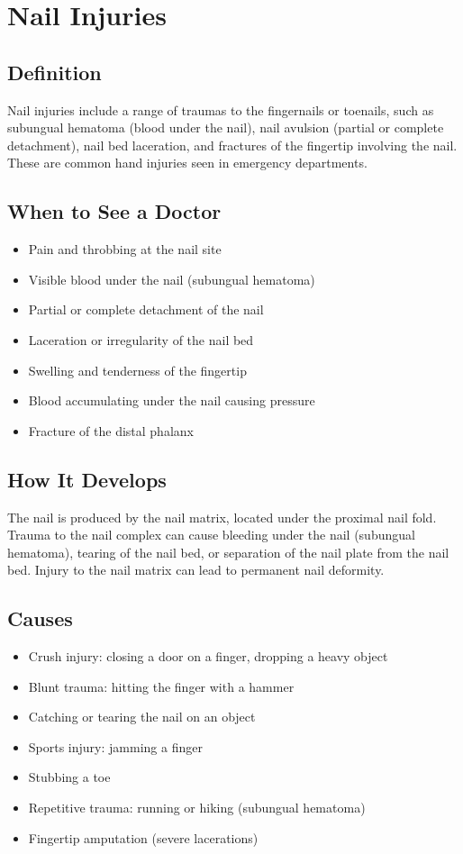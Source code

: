 \chapter{Nail Injuries}

\section*{Definition}
Nail injuries include a range of traumas to the fingernails or toenails, such as subungual hematoma (blood under the nail), nail avulsion (partial or complete detachment), nail bed laceration, and fractures of the fingertip involving the nail. These are common hand injuries seen in emergency departments.

\section*{When to See a Doctor}
\begin{itemize}
\item Pain and throbbing at the nail site
\item Visible blood under the nail (subungual hematoma)
\item Partial or complete detachment of the nail
\item Laceration or irregularity of the nail bed
\item Swelling and tenderness of the fingertip
\item Blood accumulating under the nail causing pressure
\item Fracture of the distal phalanx
\end{itemize}

\section*{How It Develops}
The nail is produced by the nail matrix, located under the proximal nail fold. Trauma to the nail complex can cause bleeding under the nail (subungual hematoma), tearing of the nail bed, or separation of the nail plate from the nail bed. Injury to the nail matrix can lead to permanent nail deformity.

\section*{Causes}
\begin{itemize}
\item Crush injury: closing a door on a finger, dropping a heavy object
\item Blunt trauma: hitting the finger with a hammer
\item Catching or tearing the nail on an object
\item Sports injury: jamming a finger
\item Stubbing a toe
\item Repetitive trauma: running or hiking (subungual hematoma)
\item Fingertip amputation (severe lacerations)
\end{itemize}

